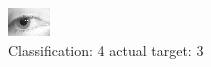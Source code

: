 \begin{figure}[h!]
\begin{center}
\includegraphics[width=0.60\columnwidth]{figures/ID1348_class_4_target_3.png}
\end{center}
\caption{ Classification: 4 actual target: 3}
\label{fig:ID1348_class_4_target_3}
\end{figure}
